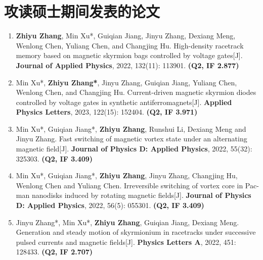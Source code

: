 \chapter*{攻读硕士期间发表的论文}
\begin{enumerate}[leftmargin=4ex, labelsep=1.5ex, itemsep=1ex, topsep=1ex,partopsep=1ex,parsep=0pt]
    \renewcommand{\labelenumi}{[\theenumi]}
    \item \textbf{Zhiyu Zhang}, Min Xu*, Guiqian Jiang, Jinyu Zhang, Dexiang Meng, Wenlong Chen, Yuliang Chen, and Changjing Hu.
    High-density racetrack memory based on magnetic skyrmion bags controlled by voltage gates[J]. 
    \textbf{Journal of Applied Physics}, 2022, 132(11): 113901. \textbf{(Q2, IF 2.877)}
    \item Min Xu*, \textbf{Zhiyu Zhang*}, Jinyu Zhang, Guiqian Jiang, Yuliang Chen, Wenlong Chen, and Changjing Hu.
    Current-driven magnetic skyrmion diodes controlled by voltage gates in synthetic antiferromagnets[J]. 
    \textbf{Applied Physics Letters}, 2023, 122(15): 152404. \textbf{(Q2, IF 3.971)}
    \item Min Xu*, Guiqian Jiang*, \textbf{Zhiyu Zhang}, Runshui Li, Dexiang Meng and Jinyu Zhang.
    Fast switching of magnetic vortex state under an alternating magnetic field[J]. 
    \textbf{Journal of Physics D: Applied Physics}, 2022, 55(32): 325303. \textbf{(Q2, IF 3.409)}
    \item Min Xu*, Guiqian Jiang*, \textbf{Zhiyu Zhang}, Jinyu Zhang, Changjing Hu, Wenlong Chen and Yuliang Chen.
    Irreversible switching of vortex core in Pac-man nanodisks induced by rotating magnetic fields[J]. 
    \textbf{Journal of Physics D: Applied Physics}, 2022, 56(5): 055301. \textbf{(Q2, IF 3.409)}
    \item Jinyu Zhang*, Min Xu*, \textbf{Zhiyu Zhang}, Guiqian Jiang, Dexiang Meng.
    Generation and steady motion of skyrmionium in racetracks under successive pulsed currents and magnetic fields[J]. 
    \textbf{Physics Letters A}, 2022, 451: 128433. \textbf{(Q2, IF 2.707)}
\end{enumerate}
